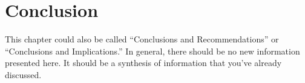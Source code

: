 \chapter{Conclusion} \label{chapterConclusion}

This chapter could also be called “Conclusions and Recommendations” or “Conclusions and Implications.” In general, there should be no new information presented here.  It should be a synthesis of information that you’ve already discussed. 
